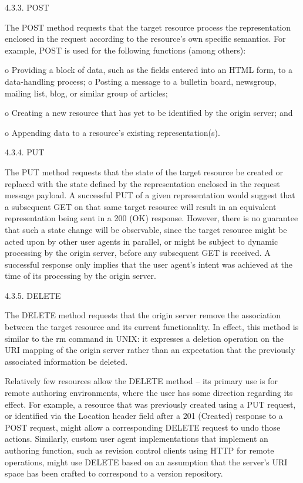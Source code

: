    

4.3.3.  POST

   The POST method requests that the target resource process the
   representation enclosed in the request according to the resource's
   own specific semantics.  For example, POST is used for the following
   functions (among others):

   o  Providing a block of data, such as the fields entered into an HTML
      form, to a data-handling process;
      o  Posting a message to a bulletin board, newsgroup, mailing list,
      blog, or similar group of articles;

   o  Creating a new resource that has yet to be identified by the
      origin server; and

   o  Appending data to a resource's existing representation(s).

  


   4.3.4.  PUT

   The PUT method requests that the state of the target resource be
   created or replaced with the state defined by the representation
   enclosed in the request message payload.  A successful PUT of a given
   representation would suggest that a subsequent GET on that same
   target resource will result in an equivalent representation being
   sent in a 200 (OK) response.  However, there is no guarantee that 
   such a state change will be observable, since the target resource
   might be acted upon by other user agents in parallel, or might be
   subject to dynamic processing by the origin server, before any
   subsequent GET is received.  A successful response only implies that
   the user agent's intent was achieved at the time of its processing by
   the origin server.


  
    
    4.3.5.  DELETE
    
       The DELETE method requests that the origin server remove the
       association between the target resource and its current
       functionality.  In effect, this method is similar to the rm command
       in UNIX: it expresses a deletion operation on the URI mapping of the
       origin server rather than an expectation that the previously
       associated information be deleted.
    
      
    
       Relatively few resources allow the DELETE method -- its primary use
       is for remote authoring environments, where the user has some
       direction regarding its effect.  For example, a resource that was
       previously created using a PUT request, or identified via the
       Location header field after a 201 (Created) response to a POST
       request, might allow a corresponding DELETE request to undo those
       actions.  Similarly, custom user agent implementations that implement an authoring function, such as revision control clients using HTTP
       for remote operations, might use DELETE based on an assumption that
       the server's URI space has been crafted to correspond to a version
       repository.
    
